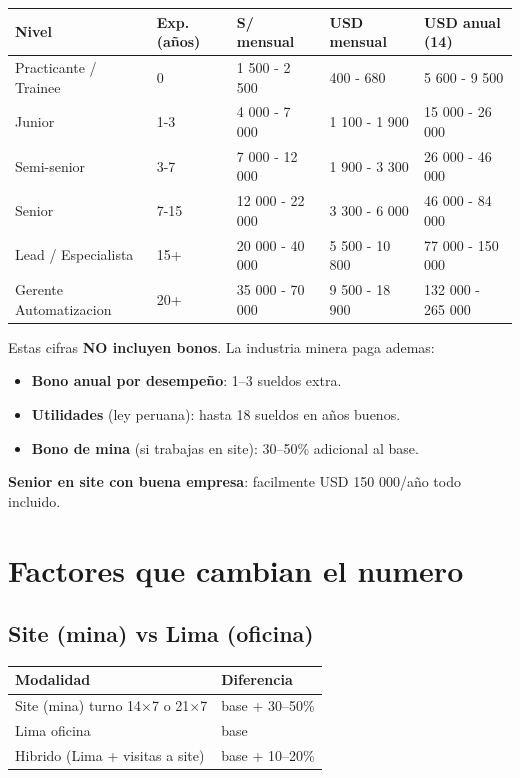 \documentclass[11pt,a4paper,oneside]{report}
\begin{document}
\begin{center}
\begin{tabular}{lp{2cm}p{2.6cm}p{2.6cm}p{3cm}}
\toprule
\textbf{Nivel} & \textbf{Exp. (años)} & \textbf{S/ mensual} & \textbf{USD mensual} & \textbf{USD anual (14)} \\
\midrule
Practicante / Trainee   & 0    & 1 500 - 2 500   & 400 - 680     & 5 600 - 9 500 \\
Junior                  & 1-3  & 4 000 - 7 000   & 1 100 - 1 900 & 15 000 - 26 000 \\
Semi-senior             & 3-7  & 7 000 - 12 000  & 1 900 - 3 300 & 26 000 - 46 000 \\
Senior                  & 7-15 & 12 000 - 22 000 & 3 300 - 6 000 & 46 000 - 84 000 \\
Lead / Especialista     & 15+  & 20 000 - 40 000 & 5 500 - 10 800 & 77 000 - 150 000 \\
Gerente Automatizacion  & 20+  & 35 000 - 70 000 & 9 500 - 18 900 & 132 000 - 265 000 \\
\bottomrule
\end{tabular}
\end{center}

Estas cifras \textbf{NO incluyen bonos}. La industria minera paga ademas:

\begin{itemize}[leftmargin=2em]
  \item \textbf{Bono anual por desempeño}: 1--3 sueldos extra.
  \item \textbf{Utilidades} (ley peruana): hasta 18 sueldos en años buenos.
  \item \textbf{Bono de mina} (si trabajas en site): 30--50\% adicional al base.
\end{itemize}

\textbf{Senior en site con buena empresa}: facilmente USD 150 000/año todo
incluido.

\section{Factores que cambian el numero}

\subsection{Site (mina) vs Lima (oficina)}

\begin{center}
\begin{tabular}{ll}
\toprule
\textbf{Modalidad} & \textbf{Diferencia} \\
\midrule
Site (mina) turno 14$\times$7 o 21$\times$7 & base + 30--50\% \\
Lima oficina                                & base \\
Hibrido (Lima + visitas a site)             & base + 10--20\% \\
\bottomrule
\end{tabular}
\end{center}
\end{document}
